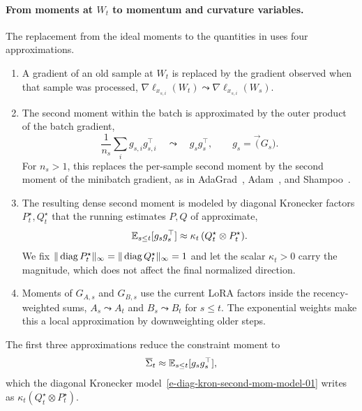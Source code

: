 \paragraph{From moments at $W_t$ to momentum and curvature variables.}
The replacement from the ideal moments to the quantities in
 uses four approximations.
\begin{enumerate}[leftmargin=1.6em,itemsep=2pt,topsep=2pt]
  \item A gradient of an old sample at $W_t$ is replaced by the gradient
  observed when that sample was processed,
  $\nabla\ell_{x_{s,i}}(W_t)\leadsto\nabla\ell_{x_{s,i}}(W_s)$.
  \item The second moment within the batch is approximated by the outer
  product of the batch gradient,
  \[
    \frac1{n_s}\sum_i g_{s,i}g_{s,i}^\top
    \quad\leadsto\quad
    g_sg_s^\top,
    \qquad g_s=\vec(G_s).
  \]
  For $n_s>1$, this replaces the per-sample second moment by the
  second moment of the minibatch gradient, as in AdaGrad~\cite{adagrad},
  Adam~\cite{adam}, and Shampoo~\cite{shampoo}.
  \item The resulting dense second moment is modeled by diagonal
  Kronecker factors $P^\star_t,Q^\star_t$ that the running estimates $P,Q$
  of  approximate,
  \begin{equation}\label{e-diag-kron-second-mom-model-01}
    \mathbb{E}_{s\le t}[g_sg_s^\top]\approx\kappa_t\,(Q^\star_t\otimes P^\star_t).
  \end{equation}
  We fix $\| \operatorname{diag} P^\star_t\|_\infty=\| \operatorname{diag} Q^\star_t\|_\infty=1$ and
  let the scalar $\kappa_t>0$ carry the magnitude, which does not affect the
  final normalized direction.
  \item Moments of $G_{A,s}$ and $G_{B,s}$ use the current LoRA factors inside the
  recency-weighted sums,
  $A_s\leadsto A_t$ and $B_s\leadsto B_t$ for $s\le t$. The exponential
  weights make this a local approximation by downweighting older steps.
\end{enumerate}
The first three approximations reduce the constraint moment to
\[
  \overline\Sigma_t\approx\mathbb{E}_{s\le t}[g_sg_s^\top],
\]
which the diagonal Kronecker model~\eqref{e-diag-kron-second-mom-model-01}
writes as $\kappa_t(Q^\star_t\otimes P^\star_t)$.

